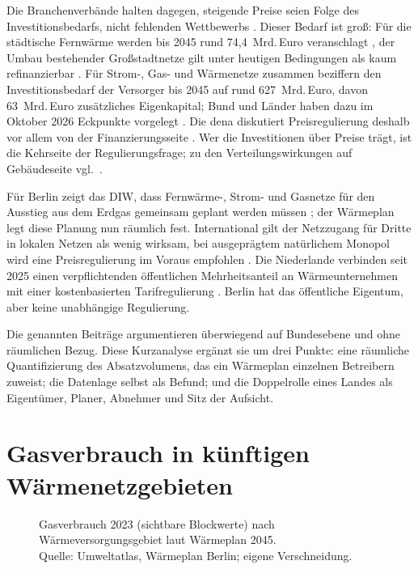 \documentclass[11pt,DIV=13,a4paper,parskip=half,abstract=true,ngerman]{scrartcl}
\begin{document}
Die Branchenverbände halten dagegen, steigende Preise seien Folge des Investitionsbedarfs, nicht fehlenden Wettbewerbs \parencite{bdew2024monopolkommission,zfk2025monopolkommission}.
Dieser Bedarf ist groß: Für die städtische Fernwärme werden bis 2045 rund 74,4~Mrd.\,Euro veranschlagt \parencite{prognos2024}, der Umbau bestehender Großstadtnetze gilt unter heutigen Bedingungen als kaum refinanzierbar \parencite{ariadne2023}.
Für Strom-, Gas- und Wärmenetze zusammen beziffern \textcite{inan2025} den Investitionsbedarf der Versorger bis 2045 auf rund 627~Mrd.\,Euro, davon 63~Mrd.\,Euro zusätzliches Eigenkapital; Bund und Länder haben dazu im Oktober 2026 Eckpunkte vorgelegt \parencite{bmf2026netze}.
Die dena diskutiert Preisregulierung deshalb vor allem von der Finanzierungsseite \parencite{dena2025}.
Wer die Investitionen über Preise trägt, ist die Kehrseite der Regulierungsfrage; zu den Verteilungswirkungen auf Gebäudeseite vgl.\ \textcite{henze2026}.

Für Berlin zeigt das DIW, dass Fernwärme-, Strom- und Gasnetze für den Ausstieg aus dem Erdgas gemeinsam geplant werden müssen \parencite{herpich2023}; der Wärmeplan legt diese Planung nun räumlich fest.
International gilt der Netzzugang für Dritte in lokalen Netzen als wenig wirksam, bei ausgeprägtem natürlichem Monopol wird eine Preisregulierung im Voraus empfohlen \parencite{soederholm2011,buerger2019}.
Die Niederlande verbinden seit 2025 einen verpflichtenden öffentlichen Mehrheitsanteil an Wärmeunternehmen mit einer kostenbasierten Tarifregulierung \parencite{wcw2025,vng2025wcw}.
Berlin hat das öffentliche Eigentum, aber keine unabhängige Regulierung.

Die genannten Beiträge argumentieren überwiegend auf Bundesebene und ohne räumlichen Bezug.
Diese Kurzanalyse ergänzt sie um drei Punkte: eine räumliche Quantifizierung des Absatzvolumens, das ein Wärmeplan einzelnen Betreibern zuweist; die Datenlage selbst als Befund; und die Doppelrolle eines Landes als Eigentümer, Planer, Abnehmer und Sitz der Aufsicht.

\section{Gasverbrauch in künftigen Wärmenetzgebieten}\label{sec:volumen}

\begin{figure}[ht]
\centering
{}
\caption{Gasverbrauch 2023 (sichtbare Blockwerte) nach
Wärmeversorgungsgebiet laut Wärmeplan 2045.\\ Quelle: Umweltatlas, Wärmeplan Berlin;
eigene Verschneidung.}\label{fig:gebiete}
\end{figure}
\end{document}
